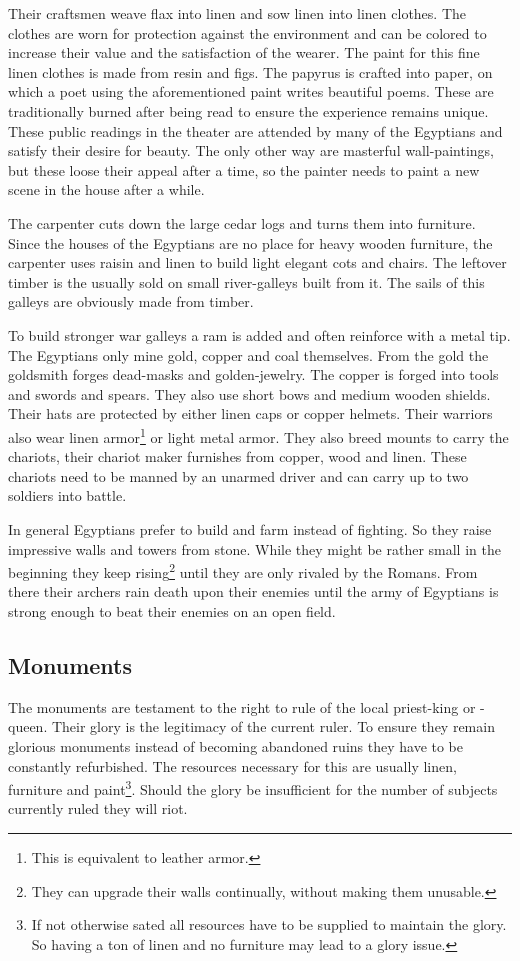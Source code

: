 \documentclass[a4paper]{book}
\begin{document}
	Their craftsmen weave flax into linen and sow linen into linen clothes.
	The clothes are worn for protection against the environment
	and can be colored to increase their value and the satisfaction of the wearer. 
	The paint for this fine linen clothes is made from resin and figs.
	The papyrus is crafted into paper, on which a poet using the aforementioned paint
	writes beautiful poems.
	These are traditionally burned after being read to ensure the experience remains unique.
	These public readings in the theater are attended by many of the \gls{Egyptians}
	and satisfy their desire for beauty.
	The only other way are masterful wall-paintings,
	but these loose their appeal after a time,
	so the painter needs to paint a new scene in the house after a while.

	The carpenter cuts down the large cedar logs and turns them into furniture.
	Since the houses of the \gls{Egyptians} are no place for heavy wooden furniture,
	the carpenter uses raisin and linen to build light elegant cots and chairs.
	The leftover timber is the usually sold on small river-galleys built from it.
	The sails of this galleys are obviously made from timber.

	To build stronger war galleys a ram is added and often reinforce with a metal tip.
	The \gls{Egyptians} only mine gold, copper and coal themselves.
	From the gold the goldsmith forges dead-masks and golden-jewelry.
	The copper is forged into tools and swords and spears.
	They also use short bows and medium wooden shields.
	Their hats are protected by either linen caps or copper helmets.
	Their warriors also wear linen armor\footnote{
		This is equivalent to leather armor.
	} or light metal armor.
	They also breed mounts to carry the chariots, their chariot maker
	furnishes from copper, wood and linen.
	These chariots need to be manned by an unarmed driver and can carry up to two soldiers into battle.

	In general \gls{Egyptians} prefer to build and farm instead of fighting.
	So they raise impressive walls and towers from stone.
	While they might be rather small in the beginning they keep rising\footnote{
		They can upgrade their walls continually, without making them unusable.
	}
	until they are only rivaled by the \gls{Romans}.
	From there their archers rain death upon their enemies
	until the army of \gls{Egyptians} is strong enough to beat their enemies on 
	an open field.

	\subsection{Monuments}
		The monuments are testament to the right to rule of the local priest-king or -queen.
		Their glory is the legitimacy of the current ruler.
		To ensure they remain glorious monuments instead of becoming abandoned ruins
		they have to be constantly refurbished.
		The resources necessary for this are usually linen, furniture and paint\footnote{
			If not otherwise sated all resources have to be supplied to maintain the glory.
			So having a ton of linen and no furniture may lead to a glory issue.
		}.
		Should the glory be insufficient for the number of subjects currently ruled
		they will riot.
\end{document}
